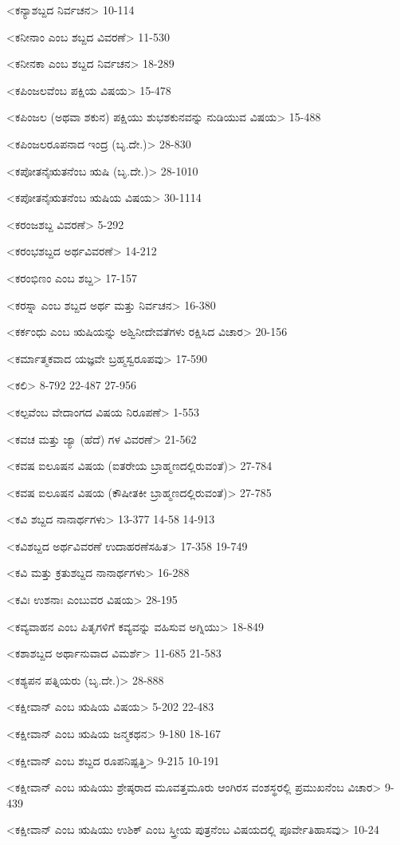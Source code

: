 <ಕನ್ಯಾಶಬ್ದದ ನಿರ್ವಚನ>
10-114

<ಕನೀನಾಂ ಎಂಬ ಶಬ್ದದ ವಿವರಣೆ>
11-530

<ಕನೀನಕಾ ಎಂಬ ಶಬ್ದದ ನಿರ್ವಚನ>
18-289

<ಕಪಿಂಜಲವೆಂಬ ಪಕ್ಷಿಯ ವಿಷಯ>
15-478

<ಕಪಿಂಜಲ (ಅಥವಾ ಶಕುನ) ಪಕ್ಷಿಯು ಶುಭಶಕುನವನ್ನು ನುಡಿಯುವ ವಿಷಯ>
15-488

<ಕಪಿಂಜಲರೂಪನಾದ ಇಂದ್ರ (ಬೃ.ದೇ.)>
28-830

<ಕಪೋತನೈಋತನೆಂಬ ಋಷಿ (ಬೃ.ದೇ.)>
28-1010

<ಕಪೋತನೈಋತನೆಂಬ ಋಷಿಯ ವಿಷಯ>
30-1114

<ಕರಂಜಶಬ್ದ ವಿವರಣೆ>
5-292

<ಕರಂಭಶಬ್ದದ ಅರ್ಥವಿವರಣೆ>
14-212

<ಕರಂಭಿಣಂ ಎಂಬ ಶಬ್ದ>
17-157

<ಕರಸ್ನಾ ಎಂಬ ಶಬ್ದದ ಅರ್ಥ ಮತ್ತು ನಿರ್ವಚನ>
16-380

<ಕರ್ಕಂಧು ಎಂಬ ಋಷಿಯನ್ನು ಅಶ್ವಿನೀದೇವತೆಗಳು ರಕ್ಷಿಸಿದ ವಿಚಾರ>
20-156

<ಕರ್ಮಾತ್ಮಕವಾದ ಯಜ್ಞವೇ ಬ್ರಹ್ಮಸ್ವರೂಪವು>
17-590

<ಕಲಿ>
8-792
22-487 
27-956

<ಕಲ್ಪವೆಂಬ ವೇದಾಂಗದ ವಿಷಯ ನಿರೂಪಣೆ>
1-553

<ಕವಚ ಮತ್ತು ಜ್ಯಾ (ಹೆದೆ) ಗಳ ವಿವರಣೆ>
21-562

<ಕವಷ ಐಲೂಷನ ವಿಷಯ (ಐತರೇಯ ಬ್ರಾಹ್ಮಣದಲ್ಲಿರುವಂತೆ)>
27-784

<ಕವಷ ಐಲೂಷನ ವಿಷಯ (ಕೌಷೀತಕೀ ಬ್ರಾಹ್ಮಣದಲ್ಲಿರುವಂತೆ)>
27-785

<ಕವಿ ಶಬ್ದದ ನಾನಾರ್ಥಗಳು>
13-377 
14-58
14-913

<ಕವಿಶಬ್ದದ ಅರ್ಥವಿವರಣೆ ಉದಾಹರಣೆಸಹಿತ>
17-358
19-749

<ಕವಿ ಮತ್ತು ಕ್ರತುಶಬ್ದದ ನಾನಾರ್ಥಗಳು>
16-288

<ಕವಿಃ ಉಶನಾಃ ಎಂಬುವರ ವಿಷಯ>
28-195

<ಕವ್ಯವಾಹನ ಎಂಬ ಪಿತೃಗಳಿಗೆ ಕವ್ಯವನ್ನು ವಹಿಸುವ ಅಗ್ನಿಯು>
18-849

<ಕಶಾಶಬ್ದದ ಅರ್ಥಾನುವಾದ ವಿಮರ್ಶೆ>
11-685
21-583

<ಕಶ್ಯಪನ ಪತ್ನಿಯರು (ಬೃ.ದೇ.)>
28-888

<ಕಕ್ಷೀವಾನ್‍ ಎಂಬ ಋಷಿಯ ವಿಷಯ>
5-202
22-483

<ಕಕ್ಷೀವಾನ್‍ ಎಂಬ ಋಷಿಯ ಜನ್ಮಕಥನ>
9-180
18-167

<ಕಕ್ಷೀವಾನ್‍ ಎಂಬ ಶಬ್ದದ ರೂಪನಿಷ್ಪತ್ತಿ>
9-215
10-191

<ಕಕ್ಷೀವಾನ್‍ ಎಂಬ ಋಷಿಯು ಶ್ರೇಷ್ಠರಾದ ಮೂವತ್ತಮೂರು ಆಂಗಿರಸ ವಂಶಸ್ಥರಲ್ಲಿ ಪ್ರಮುಖನೆಂಬ ವಿಚಾರ>
9-439

<ಕಕ್ಷೀವಾನ್‍ ಎಂಬ ಋಷಿಯು ಉಶಿಕ್‍ ಎಂಬ ಸ್ತ್ರೀಯ ಪುತ್ರನೆಂಬ ವಿಷಯದಲ್ಲಿ ಪೂರ್ವೇತಿಹಾಸವು>
10-24

